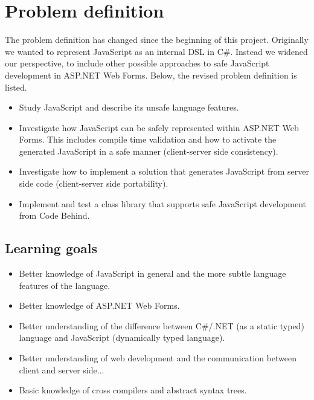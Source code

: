 \section{Problem definition}
	The problem definition has changed since the beginning of this project. Originally we wanted to represent JavaScript as an internal DSL in C\#. Instead we widened our perspective, to include other possible approaches to safe JavaScript development in ASP.NET Web Forms. Below, the revised problem definition is listed.
	\begin{itemize}

	\item Study JavaScript and describe its unsafe language features.

	\item Investigate how JavaScript can be safely represented within ASP.NET Web Forms. This includes compile time validation and how to activate the generated JavaScript in a safe manner (client-server side consistency).

	\item Investigate how to implement a solution that generates JavaScript from server side code (client-server side portability).

	\item Implement and test a class library that supports safe JavaScript development from Code Behind.


	\end{itemize}



	\subsection{Learning goals}
		\begin{itemize}

		\item Better knowledge of JavaScript in general and the more subtle language features of the language.
		\item Better knowledge of ASP.NET Web Forms.
	 	\item Better understanding of the difference between C\#/.NET (as a static typed) language and JavaScript (dynamically typed language).
		\item Better understanding of web development and the communication between client and server side...
		\item Basic knowledge of cross compilers and abstract syntax trees.
		\end{itemize}

